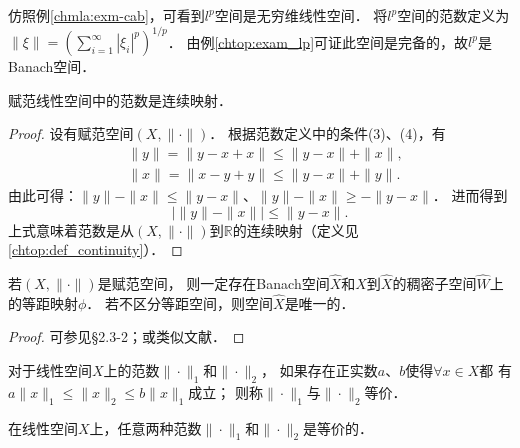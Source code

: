 \begin{example}\label{chhs:exam_lpB}
	仿照例\ref{chmla:exm-cab}，可看到$l^p$空间是无穷维线性空间．
	将$l^p$空间的范数定义为
	$\|\xi\|=\left(\sum_{i=1}^{\infty}\left|\xi_i\right|^p\right)^{1 / p}$．
	由例\ref{chtop:exam_lp}可证此空间是完备的，故$l^p$是Banach空间．
\end{example}


\begin{proposition}
	赋范线性空间中的范数是连续映射．
\end{proposition}

\begin{proof}
	设有赋范空间$(X,\|\cdot\|)$．
	根据范数定义中的条件(3)、(4)，有
	\begin{align*}
		& \|y\|=\|y-x+x\| \leqslant\|y-x\|+\|x\|, \\
		& \|x\|=\|x-y+y\| \leqslant\|y-x\|+\|y\| .
	\end{align*}
	由此可得：$\|y\|-\|x\| \leqslant\|y-x\|$、$\|y\|-\|x\| \geqslant-\|y-x\|$．	进而得到
	\begin{equation}
		\left| \|y\|-\|x\| \right| \leqslant\|y-x\| .
	\end{equation}
	上式意味着范数是从$(X,\|\cdot\|)$到$\mathbb{R}$的连续映射（定义见\ref{chtop:def_continuity}）．
\end{proof}

\begin{theorem}\label{chhs:thm_iso-NS}
	若$(X,\|\cdot\|)$是赋范空间，
	则一定存在Banach空间$\hat{X}$和$X$到$\hat{X}$的稠密子空间$\widehat{W}$上的等距映射$\phi$．
	若不区分等距空间，则空间$\hat{X}$是唯一的．
\end{theorem}
\begin{proof}
	可参见\parencite{Kreyszig-1991}\S 2.3-2；或类似文献．
\end{proof}



\begin{definition}
	对于线性空间$X$上的范数$\|\cdot\|_{1}$和$\|\cdot\|_{2}$，
	如果存在正实数$a$、$b$使得$\forall x\in X$都
	有$a\|x\|_{1} \leqslant\|x\|_2 \leqslant b\|x\|_{1}$成立；
	则称$\|\cdot\|_{1}$与$\|\cdot\|_{2}${\heiti 等价}．
\end{definition}



\begin{theorem}\label{chhs:thm_Nequiv}
	在线性空间$X$上，任意两种范数$\|\cdot\|_{1}$和$\|\cdot\|_{2}$是等价的．
\end{theorem}

